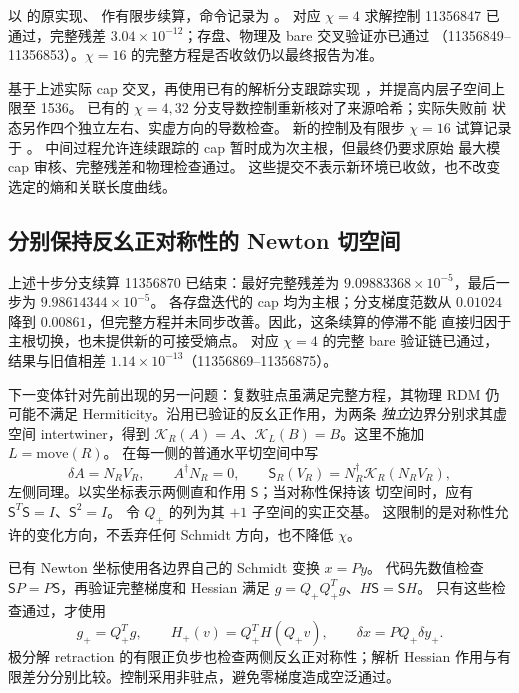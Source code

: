 以  的原实现、
作有限步续算，命令记录为 。
对应 $\chi=4$ 求解控制 11356847 已通过，完整残差
$3.04\times10^{-12}$；存盘、物理及 bare 交叉验证亦已通过
（11356849--11356853）。$\chi=16$ 的完整方程是否收敛仍以最终报告为准。

基于上述实际 cap 交叉，再使用已有的解析分支跟踪实现
，并提高内层子空间上限至 1536。
已有的 $\chi=4,32$ 分支导数控制重新核对了来源哈希；实际失败前
状态另作四个独立左右、实虚方向的导数检查。
新的控制及有限步 $\chi=16$ 试算记录于
。
中间过程允许连续跟踪的 cap 暂时成为次主根，但最终仍要求原始
最大模 cap 审核、完整残差和物理检查通过。
这些提交不表示新环境已收敛，也不改变选定的熵和关联长度曲线。

\subsection{分别保持反幺正对称性的 Newton 切空间}
上述十步分支续算 11356870 已结束：最好完整残差为
$9.09883368\times10^{-5}$，最后一步为 $9.98614344\times10^{-5}$。
各存盘迭代的 cap 均为主根；分支梯度范数从 $0.01024$ 降到
$0.00861$，但完整方程并未同步改善。因此，这条续算的停滞不能
直接归因于主根切换，也未提供新的可接受熵点。
对应 $\chi=4$ 的完整 bare 验证链已通过，结果与旧值相差
$1.14\times10^{-13}$（11356869--11356875）。

下一变体针对先前出现的另一问题：复数驻点虽满足完整方程，其物理
RDM 仍可能不满足 Hermiticity。沿用已验证的反幺正作用，为两条
\emph{独立}边界分别求其虚空间 intertwiner，得到
$\mathcal K_R(A)=A$、$\mathcal K_L(B)=B$。这里不施加 $L=\mathrm{move}(R)$。
在每一侧的普通水平切空间中写
\begin{equation}
 \delta A=N_R V_R,\qquad A^\dagger N_R=0,\qquad
 \mathsf S_R(V_R)=N_R^\dagger\mathcal K_R(N_R V_R),
\end{equation}
左侧同理。以实坐标表示两侧直和作用 $\mathsf S$；当对称性保持该
切空间时，应有 $\mathsf S^T\mathsf S=I$、$\mathsf S^2=I$。
令 $Q_+$ 的列为其 $+1$ 子空间的实正交基。
这限制的是对称性允许的变化方向，不丢弃任何 Schmidt 方向，也不降低 $\chi$。

已有 Newton 坐标使用各边界自己的 Schmidt 变换 $x=P y$。
代码先数值检查 $\mathsf S P=P\mathsf S$，再验证完整梯度和 Hessian
满足 $g=Q_+Q_+^Tg$、$H\mathsf S=\mathsf S H$。
只有这些检查通过，才使用
\begin{equation}
 g_+=Q_+^Tg,\qquad H_+(v)=Q_+^T H(Q_+v),\qquad
 \delta x=P Q_+\delta y_+.
\end{equation}
极分解 retraction 的有限正负步也检查两侧反幺正对称性；解析 Hessian
作用与有限差分分别比较。控制采用非驻点，避免零梯度造成空泛通过。

